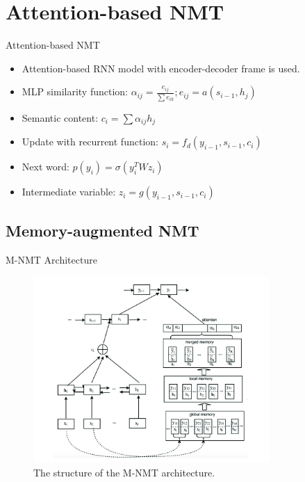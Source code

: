 \documentclass{beamer}
\begin{document}
\section{Attention-based NMT}
\begin{frame}{Attention-based NMT}
\begin{itemize}
\item Attention-based RNN model with encoder-decoder frame is used.
\item MLP similarity function: $\alpha_{ij}=\frac{e_{ij}}{\sum{e_{ik}}}; e_{ij}=a(s_{i-1},h_j)$
\item Semantic content: $c_i=\sum{\alpha_{ij}h_j}$
\item Update with recurrent function: $s_i=f_d(y_{i-1},s_{i-1},c_i)$
\item Next word: $p(y_i)=\sigma(y_i^TWz_i)$
\item Intermediate variable: $z_i=g(y_{i-1},s_{i-1},c_i)$
\end{itemize}
\end{frame}

\subsection{Memory-augmented NMT}
\begin{frame}{M-NMT Architecture}
\begin{figure}
\centering
\includegraphics[width=9cm]{m-nmt-arch}
\caption{The structure of the M-NMT architecture.}
\end{figure}
\end{frame}
\end{document}
